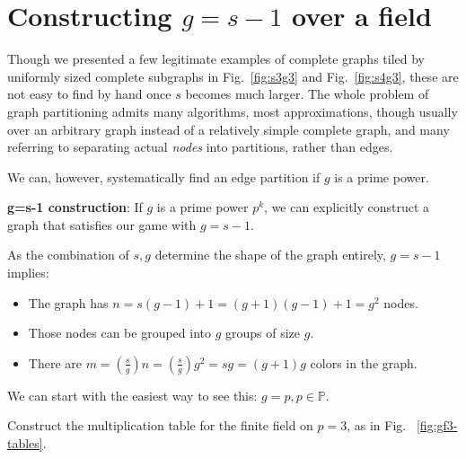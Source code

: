 \documentclass[11pt, oneside]{article} 	%
\begin{document}
\section{Constructing $g = s-1$ over a field}

Though we presented a few legitimate examples of complete graphs tiled by uniformly sized complete subgraphs in Fig.~\ref{fig:s3g3} and Fig.~\ref{fig:s4g3}, these are not easy to find by hand once $s$ becomes much larger. The whole problem of graph partitioning admits many algorithms, most approximations\cite{3}, though usually over an arbitrary graph instead of a relatively simple complete graph, and many referring to separating actual \emph{nodes} into partitions, rather than edges.

We can, however, systematically find an edge partition if $g$ is a prime power.

\begin{framed}
\textbf{g=s-1 construction}: If $g$ is a prime power $p^k$, we can explicitly construct a graph that satisfies our game with $g = s-1$.
\end{framed}


As the combination of $s, g$ determine the shape of the graph entirely, $g = s-1$ implies:
\begin{itemize}
\item The graph has $n = s(g-1) + 1 = (g+1)(g-1) + 1 = g^2$ nodes.
\item Those nodes can be grouped into $g$ groups of size $g$.
\item There are $m = (\frac{s}{g}) n = (\frac{s}{g}) g ^2 = sg = (g+1)g$ colors in the graph.
\end{itemize}


We can start with the easiest way to see this: $g = p, p \in \mathbb{P}$.

Construct the multiplication table for the finite field on $p=3$, as in Fig. ~\ref{fig:gf3-tables}.
\end{document}
